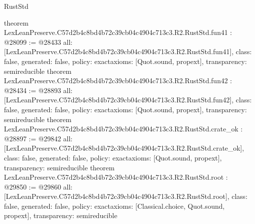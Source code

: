 \begin{lexlean}{RustStd}
\begin{coremodule}
{}
theorem LexLeanPreserve.C57d2b4c8bd4b72c39cb04c4904c713c3.R2.RustStd.fun41 : @28099 := @28433 {
  all: [LexLeanPreserve.C57d2b4c8bd4b72c39cb04c4904c713c3.R2.RustStd.fun41],
  class: false,
  generated: false,
  policy: exact{axioms: [Quot.sound, propext]},
  transparency: semireducible
}
theorem LexLeanPreserve.C57d2b4c8bd4b72c39cb04c4904c713c3.R2.RustStd.fun42 : @28434 := @28893 {
  all: [LexLeanPreserve.C57d2b4c8bd4b72c39cb04c4904c713c3.R2.RustStd.fun42],
  class: false,
  generated: false,
  policy: exact{axioms: [Quot.sound, propext]},
  transparency: semireducible
}
theorem LexLeanPreserve.C57d2b4c8bd4b72c39cb04c4904c713c3.R2.RustStd.crate_ok : @28897 := @29842 {
  all: [LexLeanPreserve.C57d2b4c8bd4b72c39cb04c4904c713c3.R2.RustStd.crate_ok],
  class: false,
  generated: false,
  policy: exact{axioms: [Quot.sound, propext]},
  transparency: semireducible
}
theorem LexLeanPreserve.C57d2b4c8bd4b72c39cb04c4904c713c3.R2.RustStd.root : @29850 := @29860 {
  all: [LexLeanPreserve.C57d2b4c8bd4b72c39cb04c4904c713c3.R2.RustStd.root],
  class: false,
  generated: false,
  policy: exact{axioms: [Classical.choice, Quot.sound, propext]},
  transparency: semireducible
}


\end{coremodule}
\end{lexlean}
